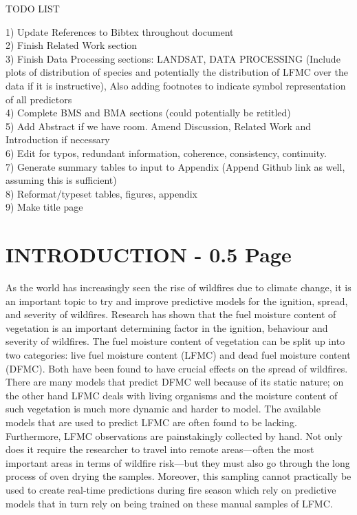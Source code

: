 \documentclass[twocolumn,10pt]{article}
\author{\fontsize{10pt}{10pt}\selectfont \textbf{Antoine Carnec and Clinton Leung}}
\begin{document}
\thispagestyle{alim}

\justifying

TODO LIST

1) Update References to Bibtex throughout document \\
2) Finish Related Work section \\
3) Finish Data Processing sections: LANDSAT, DATA PROCESSING (Include plots of distribution of species and potentially the distribution of LFMC over the data if it is instructive), Also adding footnotes to indicate symbol representation of all predictors \\
4) Complete BMS and BMA sections (could potentially be retitled) \\
5) Add Abstract if we have room. Amend Discussion, Related Work and Introduction if necessary \\
6) Edit for typos, redundant information, coherence, consistency, continuity. \\
7) Generate summary tables to input to Appendix (Append Github link as well, assuming this is sufficient) \\
8) Reformat/typeset tables, figures, appendix  \\
9) Make title page



\section{INTRODUCTION - 0.5 Page}

As the world has increasingly seen the rise of wildfires due to climate change, it is an important topic to try and improve predictive models for the ignition, spread, and severity of wildfires. Research has shown that the fuel moisture content of vegetation is an important determining factor in the ignition, behaviour and severity of wildfires. The fuel moisture content of vegetation can be split up into two categories: live fuel moisture content (LFMC) and dead fuel moisture content (DFMC). Both have been found to have crucial effects on the spread of wildfires. There are many models that predict DFMC well because of its static nature; on the other hand LFMC deals with living organisms and the moisture content of such vegetation is much more dynamic and harder to model. The available models that are used to predict LFMC are often found to be lacking. Furthermore, LFMC observations are painstakingly collected by hand. Not only does it require the researcher to travel into remote areas---often the most important areas in terms of wildfire risk---but they must also go through the long process of oven drying the samples. Moreover, this sampling cannot practically be used to create real-time predictions during fire season which rely on predictive models that in turn rely on being trained on these manual samples of LFMC. \\
\end{document}
